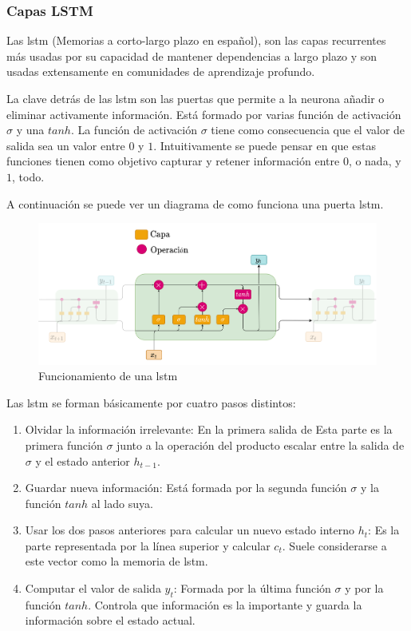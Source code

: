 \subsubsection{Capas LSTM}\label{lstm_theory}

Las \acrfull{lstm} (Memorias a corto-largo plazo en español), son las capas recurrentes más usadas por su capacidad de mantener dependencias a largo plazo y son usadas extensamente en comunidades de aprendizaje profundo.
\newline

La clave detrás de las \acrshort{lstm} son las puertas que permite a la neurona añadir o eliminar activamente información. Está formado por varias función de activación $\sigma$ y una $tanh$. La función de activación $\sigma$ tiene como consecuencia que el valor de salida sea un valor entre $0$ y $1$. Intuitivamente se puede pensar en que estas funciones tienen como objetivo  capturar y retener información entre $0$, o nada, y $1$, todo.

A continuación se puede ver un diagrama de como funciona una puerta \acrshort{lstm}.


\begin{figure}[H]
    \centering
    \includegraphics[width=16cm]{images/state-of-art/rnn/lstm.png}
    \caption{Funcionamiento de una \acrshort{lstm}}
\end{figure}


Las \acrshort{lstm} se forman básicamente por cuatro pasos distintos:
\begin{enumerate}
    \item Olvidar la información irrelevante: En la primera salida de Esta parte es la primera función $\sigma$ junto a la operación del producto escalar entre la salida de $\sigma$ y el estado anterior $h_{t-1}$.
    \item Guardar nueva información: Está formada por la segunda función $\sigma$ y la función $tanh$ al lado suya.
    \item Usar los dos pasos anteriores para calcular un nuevo estado interno $h_t$: Es la parte representada por la línea superior y calcular $c_t$. Suele considerarse a este vector como la memoria de \acrshort{lstm}.
    \item Computar el valor de salida $y_t$: Formada por la última función $\sigma$ y por la función $tanh$. Controla que información es la importante y guarda la información sobre el estado actual.
\end{enumerate}

